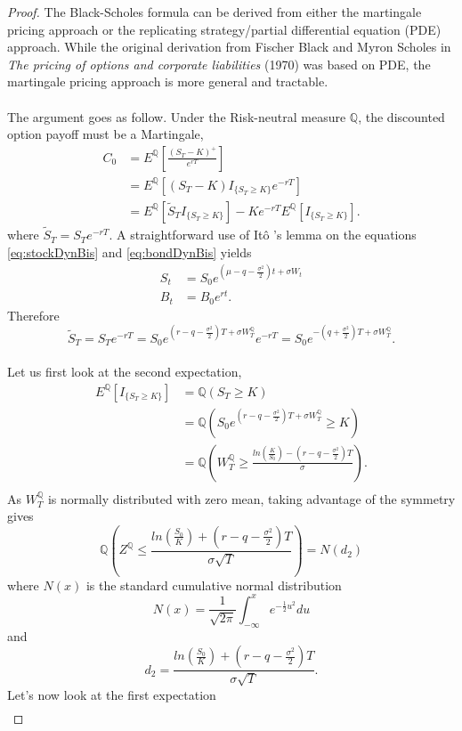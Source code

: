 \documentclass{article}
\theoremstyle{definition}
\theoremstyle{remark}
\newcommand{\measure}[1]{\ensuremath{\mathbb{#1}}}
\newcommand{\Ito}{It\^{o} }
\newcommand{\I}[1]{\ensuremath{I_{\{#1\}}}}
\newcommand{\stdcumnormal}[1]{\ensuremath{\frac{1}{\sqrt{2\pi}}\int_{-\infty}^{#1}e^{-\frac{1}{2}u^2}du}}
\newcommand{\dtwo}{\ensuremath{\frac{ln\left( \frac{S_0}{K}\right)+\left( r-q-\frac{\sigma^2}{2}\right)T}{\sigma\sqrt{T}}}}
\begin{document}
\begin{proof}
The Black-Scholes formula can be derived from either the martingale pricing approach or the replicating strategy/partial differential equation (PDE) approach. While the original derivation from Fischer Black and Myron Scholes in \emph{The pricing of options and corporate liabilities} (1970) was based on PDE, the martingale pricing approach is more general and tractable.\\
\\
The argument goes as follow. Under the Risk-neutral measure \measure{Q}, the discounted option payoff must be a Martingale,
\begin{align*}
C_0&=E^\measure{Q}\left[\frac{(S_T-K)^+}{e^{rT}}\right]\\
&=E^\measure{Q}\left[(S_T-K)\I{S_T \geq K}e^{-rT}\right]\\
&=E^\measure{Q}[\tilde{S}_T\I{S_T \geq K}]-Ke^{-rT}E^\measure{Q}[\I{S_T \geq K}].
\end{align*}
where $\tilde{S}_T=S_Te^{-rT}$.
A straightforward use of \Ito's lemma on the equations \eqref{eq:stockDynBis} and \eqref{eq:bondDynBis} yields
\begin{align*}
S_t&=S_0e^{(\mu-q-\frac{\sigma^2}{2})t+\sigma W_t}\\
B_t&=B_0e^{rt}.
\end{align*}
Therefore
\begin{equation*}
\tilde{S}_T=S_Te^{-rT}=S_0e^{(r-q-\frac{\sigma^2}{2})T+\sigma W_T^\measure{Q}}e^{-rT}=S_0e^{-(q+\frac{\sigma^2}{2})T+\sigma W_T^\measure{Q}}.
\end{equation*}
\\
Let us first look at the second expectation,
\begin{align*}
E^\measure{Q}[\I{S_T \geq K}]&=\measure{Q}(S_T \geq K)\\
&=\measure{Q}\left(S_0e^{\left( r-q-\frac{\sigma^2}{2}\right)T+\sigma W_T^\measure{Q}} \geq K\right)\\
&=\measure{Q}\left(W_T^\measure{Q} \geq \frac{ln\left( \frac{K}{S_0}\right)-\left( r-q-\frac{\sigma^2}{2}\right)T}{\sigma}\right).\\
\end{align*}
As $W_T^\measure{Q}$ is normally distributed with zero mean, taking advantage of the symmetry gives
$$\measure{Q}\left(Z^\measure{Q} \leq \dtwo\right)=N(d_2)$$
where $N(x)$ is the standard cumulative normal distribution
$$N(x)=\stdcumnormal{x}$$
and 
$$d_2=\dtwo.$$
Let's now look at the first expectation
\begin{align*}

\end{align*}
\end{proof}
\end{document}
